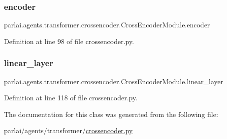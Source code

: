 \subsubsection{\texorpdfstring{encoder}{encoder}}
{\footnotesize\ttfamily parlai.\+agents.\+transformer.\+crossencoder.\+Cross\+Encoder\+Module.\+encoder}



Definition at line 98 of file crossencoder.\+py.

\mbox{\label{classparlai_1_1agents_1_1transformer_1_1crossencoder_1_1CrossEncoderModule_a50568203fcea07cca868109b95dc8dfc}} 
\subsubsection{\texorpdfstring{linear\+\_\+layer}{linear\_layer}}
{\footnotesize\ttfamily parlai.\+agents.\+transformer.\+crossencoder.\+Cross\+Encoder\+Module.\+linear\+\_\+layer}



Definition at line 118 of file crossencoder.\+py.



The documentation for this class was generated from the following file\+:\begin{DoxyCompactItemize}
\item 
parlai/agents/transformer/\hyperlink{crossencoder_8py}{crossencoder.\+py}\end{DoxyCompactItemize}
